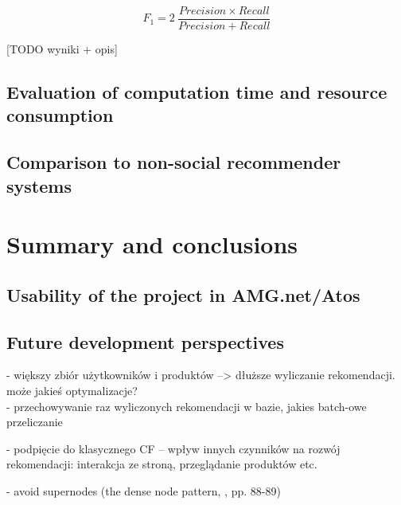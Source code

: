 \documentclass[12pt]{report}
\begin{document}
\begin{equation}
F_1 = 2\:\frac{Precision \times Recall}{Precision + Recall}
\label{eq.fmeasure}
\end{equation}
\hbox{}

[TODO wyniki + opis]

\section{Evaluation of computation time and resource consumption}
\section{Comparison to non-social recommender systems}

\chapter{Summary and conclusions}
\section{Usability of the project in AMG.net/Atos}
\section{Future development perspectives}

- większy zbiór użytkowników i produktów --> dłuższe wyliczanie rekomendacji. może jakieś optymalizacje?\\

- przechowywanie raz wyliczonych rekomendacji w bazie, jakies batch-owe przeliczanie

- podpięcie do klasycznego CF
-- wpływ innych czynników na rozwój rekomendacji: interakcja ze stroną, przeglądanie produktów etc.

- avoid supernodes (the dense node pattern, \cite{learning_neo4j}, pp. 88-89)


\end{document}
